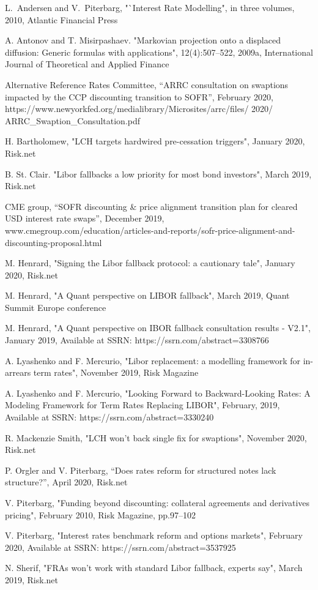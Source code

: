 \documentclass{article}
\begin{document}
\begin{thebibliography}{99}
 L.~Andersen and V.~Piterbarg, "`Interest Rate Modelling",
in three volumes, 2010, Atlantic Financial Press

 A. Antonov and T. Misirpashaev. "Markovian projection onto
a displaced diffusion: Generic formulas with applications", 12(4):507--522,
2009a, International Journal of Theoretical and Applied Finance

 Alternative Reference Rates Committee, \textquotedblleft ARRC
consultation on swaptions impacted by the CCP discounting transition to
SOFR\textquotedblright , February 2020,
https://www.newyorkfed.org/medialibrary/Microsites/arrc/files/ 2020/
ARRC\_Swaption\_Consultation.pdf

 H. Bartholomew, "LCH targets hardwired pre-cessation
triggers", January 2020, Risk.net

 B. St. Clair. "Libor fallbacks a low priority for most
bond investors", March 2019, Risk.net

 CME group, ``SOFR discounting \& price alignment transition
plan for cleared USD interest rate swaps'', December 2019,
www.cmegroup.com/education/articles-and-reports/sofr-price-alignment-and-discounting-proposal.html

 M. Henrard, "Signing the Libor fallback protocol: a
cautionary tale", January 2020, Risk.net

 M. Henrard, "A Quant perspective on LIBOR fallback",
March 2019, Quant Summit Europe conference

 M. Henrard, "A Quant perspective on IBOR fallback
consultation results - V2.1", January 2019, Available at SSRN:
https://ssrn.com/abstract=3308766

 A. Lyashenko and F. Mercurio, "Libor replacement: a
modelling framework for in-arrears term rates", November 2019, Risk Magazine

 A. Lyashenko and F. Mercurio, "Looking Forward to
Backward-Looking Rates: A Modeling Framework for Term Rates Replacing
LIBOR", February, 2019, Available at SSRN: https://ssrn.com/abstract=3330240

 R. Mackenzie Smith, "LCH won't back single fix for
swaptions", November 2020, Risk.net

 P. Orgler and V. Piterbarg, \textquotedblleft Does rates
reform for structured notes lack structure?\textquotedblright , April 2020,
Risk.net

 V. Piterbarg, "Funding beyond discounting: collateral
agreements and derivatives pricing", February 2010, Risk Magazine, pp.97--102

 V. Piterbarg, "Interest rates benchmark reform and options
markets", February 2020, Available at SSRN: https://ssrn.com/abstract=3537925

 N. Sherif, "FRAs won't work with standard Libor
fallback, experts say", March 2019, Risk.net
\end{thebibliography}
\end{document}
